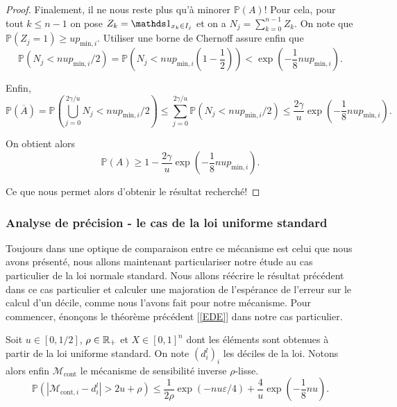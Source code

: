 \begin{proof}
    Finalement, il ne nous reste plus qu'à minorer \(\mathbb P (A)\)! Pour cela, pour tout \(k \leq n - 1\) on pose \(Z_k = \un_{x_k \in I_j}\) et on a \(N_j = \sum_{k = 0}^{n-1} Z_k\). On note que \(\mathbb P (Z_j = 1) \geq u p_{\text{min}, i}\). Utiliser une borne de {\sc Chernoff} \cite{10.5555/3134214} assure enfin que 
    \[
        \mathbb P \left( N_j < n u p_{\text{min}, i}/2\right) = \mathbb P \left( N_j < n u p_{\text{min}, i} \left( 1 - \dfrac{1}{2} \right)\right) < \exp\left( - \dfrac{1}{8}n u p_{\text{min}, i} \right).
    \]

    Enfin,
    \[
    \mathbb P \left( \overline A \right)  = \mathbb P \left( \bigcup_{j = 0}^{2\gamma /u} N_j < n u p_{\text{min}, i}/2  \right) \leq \sum_{j = 0}^{2\gamma/u} \mathbb P \left( N_j < n u p_{\text{min}, i}/2 \right) \leq \dfrac{2\gamma}{u}\exp\left( - \dfrac{1}{8}n u p_{\text{min}, i} \right).
    \]


    On obtient alors 
    \[
        \mathbb P (A) \geq 1 - \dfrac{2\gamma}{u}\exp\left( - \dfrac{1}{8}n u p_{\text{min}, i} \right).
    \]

    Ce que nous permet alors d'obtenir le résultat recherché!
\end{proof}

\subsubsection{Analyse de précision - le cas de la loi uniforme standard}

Toujours dans une optique de comparaison entre ce mécanisme est celui que nous avons présenté, nous allons maintenant particulariser notre étude au cas particulier de la loi normale standard. Nous allons réécrire le résultat précédent dans ce cas particulier et calculer une majoration de l’espérance de l'erreur sur le calcul d'un décile, comme nous l'avons fait pour notre mécanisme. Pour commencer, énonçons le théorème précédent [\ref{EDE}] dans notre cas particulier.

\begin{theorem}
    \label{EDE}
    Soit \(u \in [0, 1/2]\), \(\rho \in \mathbb{R}_+\) et \(X \in [0,1]^n\) dont les éléments sont obtenues à partir de la loi uniforme standard. On note \((d_i^l)_i\) les déciles de la loi. Notons alors enfin \(\mathcal M_{\text{cont}}\) le mécanisme de sensibilité inverse \(\rho\)-lisse.
    \[
        \mathbb P\left( |\mathcal  M_{\text{cont}, i} - d_i^l| > 2u + \rho \right) \leq  \dfrac{1}{2\rho}\exp\left( -{nu\varepsilon}/{4} \right) + \dfrac{4}{u}\exp\left( - \dfrac{1}{8}n u \right).
    \]
\end{theorem}



